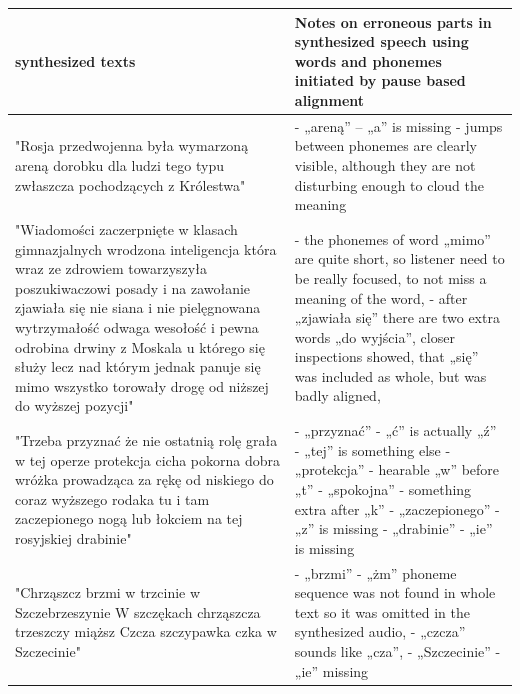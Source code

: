 \documentclass[12pt,a4paper,english]{article}
\begin{document}
\begin{center}
\begin{tabular}{| p{8cm} | p{8cm} |}
\hline
\rowcolor[gray]{0.8}
synthesized texts &
Notes on erroneous parts in synthesized speech using words and phonemes initiated by pause based alignment
\\ \hline
"Rosja przedwojenna była wymarzoną areną dorobku dla ludzi tego typu zwłaszcza pochodzących z Królestwa" &
- „areną” – „a” is missing \newline
- jumps between phonemes are clearly visible, although they are not disturbing enough to cloud the meaning
\\ \hline
"Wiadomości zaczerpnięte w klasach gimnazjalnych wrodzona inteligencja która wraz ze zdrowiem towarzyszyła poszukiwaczowi posady i na zawołanie zjawiała się nie siana i nie pielęgnowana wytrzymałość odwaga wesołość i pewna odrobina drwiny z Moskala u którego się służy lecz nad którym jednak panuje się mimo wszystko torowały drogę od niższej do wyższej pozycji" &
- the phonemes of word „mimo” are quite short, so listener need to be really focused, to not miss a meaning of the word, \newline
- after „zjawiała się” there are two extra words „do wyjścia”,
closer inspections showed, that „się” was included as whole, but was badly aligned,
\\ \hline
"Trzeba przyznać że nie ostatnią rolę grała w tej operze protekcja cicha pokorna dobra wróżka prowadząca za rękę od niskiego do coraz wyższego rodaka tu i tam zaczepionego nogą lub łokciem na tej rosyjskiej drabinie" &
- „przyznać” - „ć” is actually „ź” \newline
- „tej” is something else \newline
- „protekcja” - hearable „w” before „t” \newline
- „spokojna” - something extra after „k” \newline
- „zaczepionego” - „z” is missing \newline
- „drabinie” - „ie” is missing \newline
\\ \hline
"Chrząszcz brzmi w trzcinie w Szczebrzeszynie W szczękach chrząszcza trzeszczy miąższ Czcza szczypawka czka w Szczecinie" &
- „brzmi” - „żm” phoneme sequence was not found in whole text so it was omitted in the synthesized audio, \newline
- „czcza” sounds like „cza”, \newline
- „Szczecinie” - „ie” missing
\\ \hline

\end{tabular}
\end{center}
\end{document}
